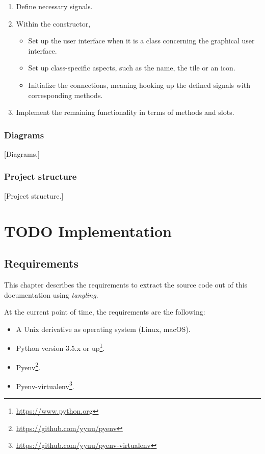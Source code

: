 \documentclass[10pt, openright, notitlepage]{scrreprt}
\begin{document}
\begin{enumerate}
\item Define necessary signals.
\item Within the constructor,
\begin{itemize}
\item Set up the user interface when it is a class concerning the graphical user
interface.
\item Set up class-specific aspects, such as the name, the tile or an icon.
\item Initialize the connections, meaning hooking up the defined signals with
corresponding methods.
\end{itemize}
\item Implement the remaining functionality in terms of methods and slots.
\end{enumerate}

\subsection{Diagrams}
\label{sec:org55bf99d}

[Diagrams.]

\subsection{Project structure}
\label{sec:orgbe1835b}

[Project structure.]

\chapter{{\bfseries\sffamily TODO} Implementation}
\label{sec:orgbd3f633}

\section{Requirements}
\label{sec:org577fc23}

This chapter describes the requirements to extract the source code out of this
documentation using \emph{tangling}.

At the current point of time, the requirements are the following:

\begin{itemize}
\item A Unix derivative as operating system (Linux, macOS).
\item Python version 3.5.x or up\footnote{\url{https://www.python.org}}.
\item Pyenv\footnote{\url{https://github.com/yyuu/pyenv}}.
\item Pyenv-virtualenv\footnote{\url{https://github.com/yyuu/pyenv-virtualenv}}.
\end{itemize}
\end{document}
